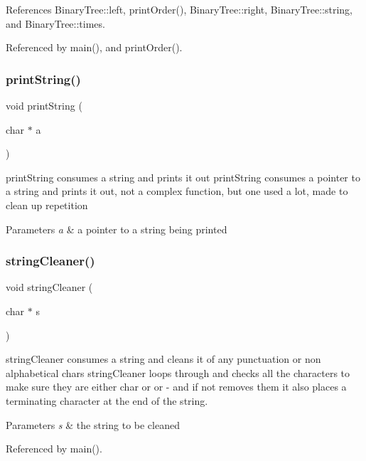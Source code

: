 References Binary\+Tree\+::left, print\+Order(), Binary\+Tree\+::right, Binary\+Tree\+::string, and Binary\+Tree\+::times.



Referenced by main(), and print\+Order().

\mbox{\label{stringfunctions_8h_a9082c5136c56d8e1112fb26bfda8d5f5}} 
\subsubsection{print\+String()}
{\footnotesize\ttfamily void print\+String (\begin{DoxyParamCaption}\item[{char $\ast$}]{a }\end{DoxyParamCaption})}

print\+String consumes a string and prints it out print\+String consumes a pointer to a string and prints it out, not a complex function, but one used a lot, made to clean up repetition 
\begin{DoxyParams}{Parameters}
{\em a} & a pointer to a string being printed \\
\hline
\end{DoxyParams}
\mbox{\label{stringfunctions_8h_ae1a6bad73e0d29a7fc8e0e080f2534e8}} 
\subsubsection{string\+Cleaner()}
{\footnotesize\ttfamily void string\+Cleaner (\begin{DoxyParamCaption}\item[{char $\ast$}]{s }\end{DoxyParamCaption})}

string\+Cleaner consumes a string and cleans it of any punctuation or non alphabetical chars string\+Cleaner loops through and checks all the characters to make sure they are either char or \textquotesingle{} or -\/ and if not removes them it also places a terminating character at the end of the string. 
\begin{DoxyParams}{Parameters}
{\em s} & the string to be cleaned \\
\hline
\end{DoxyParams}


Referenced by main().

